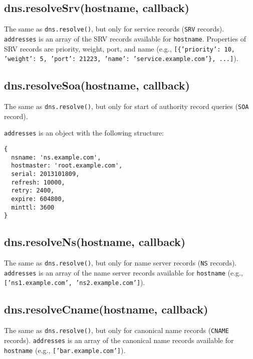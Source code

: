 \subsection{dns.resolveSrv(hostname,
callback)}\label{dns.resolvesrvhostname-callback}

The same as \texttt{dns.resolve()}, but only for service records
(\texttt{SRV} records). \texttt{addresses} is an array of the SRV
records available for \texttt{hostname}. Properties of SRV records are
priority, weight, port, and name (e.g.,
\texttt{{[}\{'priority': 10, 'weight': 5, 'port': 21223, 'name': 'service.example.com'\}, ...{]}}).

\subsection{dns.resolveSoa(hostname,
callback)}\label{dns.resolvesoahostname-callback}

The same as \texttt{dns.resolve()}, but only for start of authority
record queries (\texttt{SOA} record).

\texttt{addresses} is an object with the following structure:

\begin{verbatim}
{
  nsname: 'ns.example.com',
  hostmaster: 'root.example.com',
  serial: 2013101809,
  refresh: 10000,
  retry: 2400,
  expire: 604800,
  minttl: 3600
}
\end{verbatim}

\subsection{dns.resolveNs(hostname,
callback)}\label{dns.resolvenshostname-callback}

The same as \texttt{dns.resolve()}, but only for name server records
(\texttt{NS} records). \texttt{addresses} is an array of the name server
records available for \texttt{hostname} (e.g.,
\texttt{{[}'ns1.example.com', 'ns2.example.com'{]}}).

\subsection{dns.resolveCname(hostname,
callback)}\label{dns.resolvecnamehostname-callback}

The same as \texttt{dns.resolve()}, but only for canonical name records
(\texttt{CNAME} records). \texttt{addresses} is an array of the
canonical name records available for \texttt{hostname} (e.g.,
\texttt{{[}'bar.example.com'{]}}).

